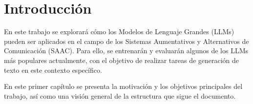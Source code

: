 \documentclass[11pt,spanish,listoffigures,listoftables]{tfgetsinf}
\begin{document}
\begin{abstract}[english]
Augmentative and Alternative Communication (AAC) systems are vital tools for facilitating communication for individuals with difficulties using language. These systems allow users to select pictograms associated with key words that will form the sentence that is wished to communicate. Then, the sentence can be synthesized with a human voice. Recent advances in the field of natural language processing, and specifically the proliferation of large language models, offer new perspectives for improving AAC systems. In particular, this work will explore how these language models can enhance the expressiveness of AAC communication when used to generate natural language from the key words (pictograms) selected by the user. In this way, this work will evaluate the performance of these models when adapted for integration into AAC systems. This evaluation will be carried out using real test sets in spanish and english extracted from the portal of the Aragonese Center for Augmentative and Alternative Communication.
\end{abstract}


\mainmatter


\chapter{Introducción} \label{cap1}

En este trabajo se explorará cómo los Modelos de Lenguaje Grandes (LLMs) pueden ser aplicados en el campo de los Sistemas Aumentativos y Alternativos de Comunicación (SAAC). Para ello, se entrenarán y evaluarán algunos de los LLMs más populares actualmente, con el objetivo de realizar tareas de generación de texto en este contexto específico.

En este primer capítulo se presenta la motivación y los objetivos principales del trabajo, así como una visión general de la estructura que sigue el documento.
\end{document}
